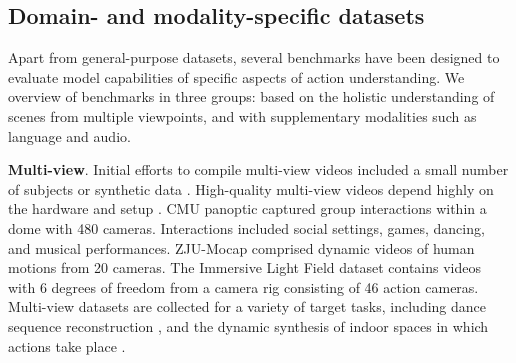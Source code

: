 \subsection{Domain- and modality-specific datasets}
\label{sec:datasets::specific}

Apart from general-purpose datasets, several benchmarks have been designed to evaluate model capabilities of specific aspects of action understanding. We overview of benchmarks in three groups: based on the holistic understanding of scenes from multiple viewpoints, and with supplementary modalities such as language and audio.

\noindent
\textbf{Multi-view}. Initial efforts to compile multi-view videos included a small number of subjects  or synthetic data . High-quality multi-view videos depend highly on the hardware and setup . CMU panoptic  captured group interactions within a dome with 480 cameras. Interactions included social settings, games, dancing, and musical performances. ZJU-Mocap  comprised dynamic videos of human motions from 20 cameras. The Immersive Light Field dataset  contains videos with 6 degrees of freedom from a camera rig consisting of 46 action cameras. Multi-view datasets are collected for a variety of target tasks, including dance sequence reconstruction , and the dynamic synthesis of indoor spaces in which actions take place .

